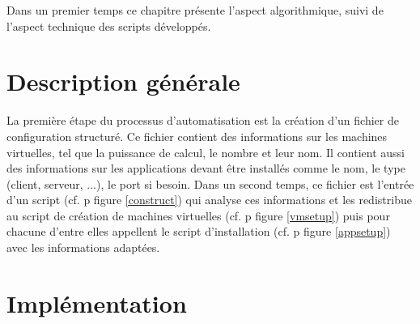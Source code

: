 \documentclass{report}
\begin{document}
    Dans un premier temps ce chapitre présente l'aspect algorithmique, suivi de l'aspect technique des scripts développés.


    \section{Description générale}

    La première étape du processus d'automatisation est la création d'un fichier de configuration structuré. Ce fichier contient des informations sur les machines virtuelles, tel que la puissance de calcul, le nombre et leur nom. Il contient aussi des informations sur les applications devant être installés comme le nom, le type (client, serveur, ...), le port si besoin. Dans un second temps, ce fichier est l'entrée d'un script (cf. p\pageref{construct} figure \ref{construct}) qui analyse ces informations et les redistribue au script de création de machines virtuelles (cf. p\pageref{vmsetup} figure \ref{vmsetup}) puis pour chacune d'entre elles appellent le script d'installation (cf. p\pageref{appsetup} figure \ref{appsetup}) avec les informations adaptées. \bigbreak
    

    \section{Implémentation}
    
\end{document}
